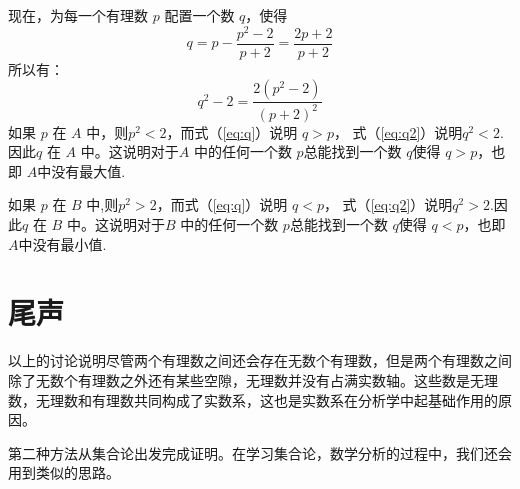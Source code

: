 \documentclass[10pt,a4paper,UTF8]{article}
\begin{document}
现在，为每一个有理数 \(p\) 配置一个数 \(q\)，使得
\begin{equation}
\label{eq:q}
q = p - \frac{p^{2}-2}{p+2}= \frac{2p+2}{p+2}
\end{equation}
所以有：
\begin{equation}
\label{eq:q2}
q^{2} -2 = \frac{2(p^{2}-2)}{(p+2)^{2}}
\end{equation}
如果 \(p\) 在 \(A\) 中，则\(p^{2}<2\)，而式（\ref{eq:q}）说明 \(q {>} p\)， 式（\ref{eq:q2}）说明\(q^{2}<2\).因此\(q\) 在 \(A\) 中。这说明对于\(A\) 中的任何一个数 \(p\)总能找到一个数 \(q\)使得 \(q {>} p\)，也即 \(A\)中没有最大值.

如果 \(p\) 在 \(B\) 中,则\(p^{2}>2\)，而式（\ref{eq:q}）说明 \(q {<} p\)， 式（\ref{eq:q2}）说明\(q^{2}>2\).因此\(q\) 在 \(B\) 中。这说明对于\(B\) 中的任何一个数 \(p\)总能找到一个数 \(q\)使得 \(q {<} p\)，也即 \(A\)中没有最小值.
\section{尾声}
\label{sec:org11f6fff}


以上的讨论说明尽管两个有理数之间还会存在无数个有理数，但是两个有理数之间除了无数个有理数之外还有某些空隙，无理数并没有占满实数轴。这些数是无理数，无理数和有理数共同构成了实数系，这也是实数系在分析学中起基础作用的原因。

第二种方法从集合论出发完成证明。在学习集合论，数学分析的过程中，我们还会用到类似的思路。
\end{document}
